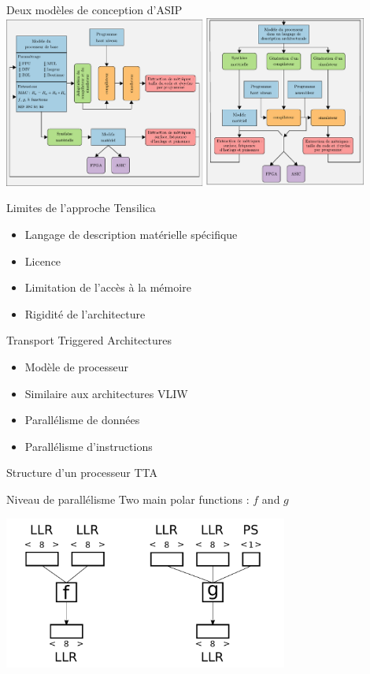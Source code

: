 \documentclass[t,compress,mathserif,12pt,xcolor=dvipsnames]{beamer}
\begin{document}
\begin{frame}[c]{Deux modèles de conception d'ASIP}
	\includegraphics[width=0.9\textwidth]{./fig/methodos}
\end{frame}


\begin{frame}[c]{Limites de l'approche Tensilica}
	\begin{itemize}
		\item Langage de description matérielle spécifique
		\item Licence
		\item Limitation de l'accès à la mémoire
		\item Rigidité de l'architecture
	\end{itemize}
\end{frame}

\begin{frame}[c]{Transport Triggered Architectures}
	\begin{itemize}
		\item Modèle de processeur
		\vspace{0.5cm}
		\item Similaire aux architectures VLIW
		\vspace{0.5cm}
		\item Parallélisme de données
		\vspace{0.5cm}
		\item Parallélisme d'instructions
	\end{itemize}
\end{frame}

\begin{frame}[c]{Structure d'un processeur TTA}
\end{frame}

\begin{frame}[c]{Niveau de parallélisme}
	Two main polar functions : $f$ and $g$
	\vspace{1cm}

	\includegraphics[width=0.7\textwidth]{fig/f_g_dimensions_scalar}
\end{frame}
\end{document}
